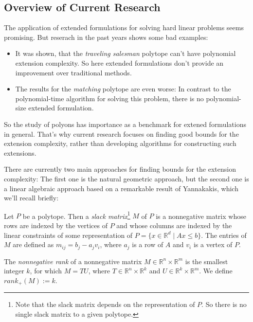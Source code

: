 \subsection{Overview of Current Research}

The application of extended formulations for solving hard linear problems seems promising. But reserach in the past years shows some bad examples:
\begin{itemize}
  \item It was shown, that the \textit{traveling salesman} polytope can't have polynomial extension complexity. So here extended formulations don't provide an improvement over traditional methods.
  \item The results for the \textit{matching} polytope are even worse: In contrast to the polynomial-time algorithm for solving this problem, there is no polynomial-size extended formulation.
\end{itemize}
So the study of polyons has importance as a benchmark for extened formulations in general.
That's why current research focuses on finding good bounds for the extension complexity, rather than developing algorithms for constructing such extensions.

There are currently two main approaches for finding bounds for the extension complexity: The first one is the natural geometric approach, but the second one is a linear algebraic approach based on a remarkable result of Yannakakis, which we'll recall briefly:

\begin{definition}
  Let $P$ be a polytope.
  Then a \textit{slack matrix}\footnote{Note that the slack matrix depends on the representation of $P$. So there is no single slack matrix to a given polytope.} $M$ of $P$ is a nonnegative matrix whose rows are indexed by the vertices of $P$ and whose columns are indexed by the linear constraints of some representation of $P=\{x \in \mathbb{R}^d \mid Ax \leq b\}$. 
  The entries of $M$ are defined as $m_{ij} = b_j - a_j v_i$, where $a_j$ is a row of $A$ and $v_i$ is a vertex of $P$.
\end{definition}

\begin{definition}
  The \textit{nonnegative rank} of a nonnegative matrix $M \in \mathbb{R}^n \times \mathbb{R}^m$ is the smallest integer $k$, for which $M = TU$, where $T \in \mathbb{R}^n \times \mathbb{R}^k$ and $U \in \mathbb{R}^k \times \mathbb{R}^m$.
  We define $rank_+(M) := k$.
\end{definition}

